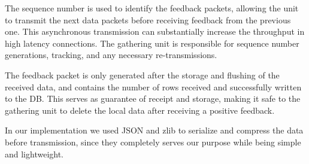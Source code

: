The sequence number is used to identify the feedback packets, allowing the unit to transmit the next data packets before receiving feedback from the previous one.
This asynchronous transmission can substantially increase the throughput in high latency connections.
The gathering unit is responsible for sequence number generations, tracking, and any necessary re-transmissions.

The feedback packet is only generated after the storage and flushing of the received data, and contains the number of rows received and successfully written to the DB.
This serves as guarantee of receipt and storage, making it safe to the gathering unit to delete the local data after receiving a positive feedback.



In our implementation we used JSON and zlib to serialize and compress the data before transmission, since they completely serves our purpose while being simple and lightweight. 
